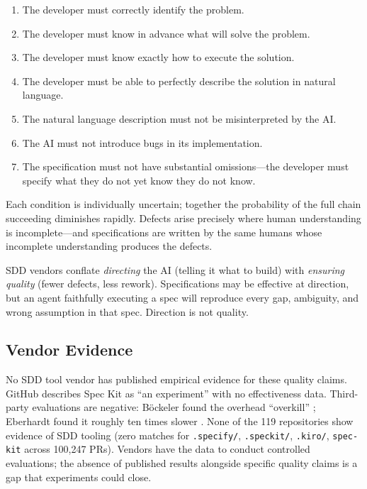 \documentclass[a4paper,UKenglish,cleveref,autoref,thm-restate]{lipics-v2021}
\begin{document}
\begin{enumerate}
\item The developer must correctly identify the problem.
\item The developer must know in advance what will solve the problem.
\item The developer must know exactly how to execute the solution.
\item The developer must be able to perfectly describe the solution in natural language.
\item The natural language description must not be misinterpreted by the AI.
\item The AI must not introduce bugs in its implementation.
\item The specification must not have substantial omissions---the developer must specify what they do not yet know they do not know.
\end{enumerate}

Each condition is individually uncertain; together the probability of the full chain succeeding diminishes rapidly. Defects arise precisely where human understanding is incomplete---and specifications are written by the same humans whose incomplete understanding produces the defects.

SDD vendors conflate \emph{directing} the AI (telling it what to build) with \emph{ensuring quality} (fewer defects, less rework). Specifications may be effective at direction, but an agent faithfully executing a spec will reproduce every gap, ambiguity, and wrong assumption in that spec. Direction is not quality.

\subsection{Vendor Evidence}

No SDD tool vendor has published empirical evidence for these quality claims. GitHub describes Spec Kit as ``an experiment'' \cite{speckit2025} with no effectiveness data. Third-party evaluations are negative: B\"ockeler found the overhead ``overkill'' \cite{fowler2025}; Eberhardt found it roughly ten times slower \cite{scottlogic2025}. None of the 119 repositories show evidence of SDD tooling (zero matches for \texttt{.specify/}, \texttt{.speckit/}, \texttt{.kiro/}, \texttt{spec-kit} across 100,247 PRs). Vendors have the data to conduct controlled evaluations; the absence of published results alongside specific quality claims is a gap that experiments could close.
\end{document}
